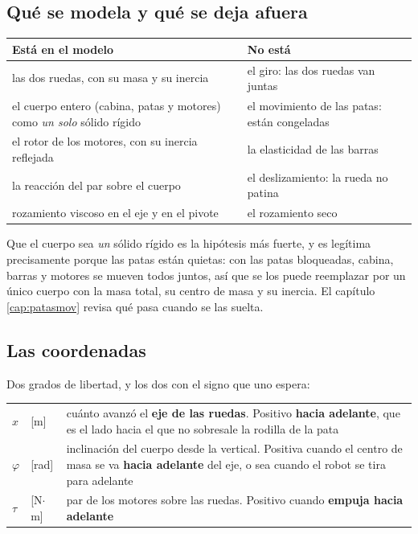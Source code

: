 \documentclass[11pt,a4paper]{report}
\begin{document}
\subsection{Qué se modela y qué se deja afuera}

\begin{center}
\small
\begin{tabular}{@{}p{7.2cm}p{7.2cm}@{}}
\toprule
\textbf{Está en el modelo} & \textbf{No está} \\
\midrule
las dos ruedas, con su masa y su inercia & el giro: las dos ruedas van juntas \\
el cuerpo entero (cabina, patas y motores) como \emph{un solo} sólido rígido & el movimiento de las patas: están congeladas \\
el rotor de los motores, con su inercia reflejada & la elasticidad de las barras \\
la reacción del par sobre el cuerpo & el deslizamiento: la rueda no patina \\
rozamiento viscoso en el eje y en el pivote & el rozamiento seco \\
\bottomrule
\end{tabular}
\end{center}

Que el cuerpo sea \emph{un} sólido rígido es la hipótesis más fuerte, y es legítima
precisamente porque las patas están quietas: con las patas bloqueadas, cabina, barras y
motores se mueven todos juntos, así que se los puede reemplazar por un único cuerpo con la
masa total, su centro de masa y su inercia. El capítulo \ref{cap:patasmov} revisa qué pasa
cuando se las suelta.

\subsection{Las coordenadas}

Dos grados de libertad, y los dos con el signo que uno espera:

\begin{center}
\begin{tabular}{@{}llp{9.4cm}@{}}
\toprule
$x$ & [m] & cuánto avanzó el \textbf{eje de las ruedas}. Positivo \textbf{hacia adelante},
que es el lado hacia el que no sobresale la rodilla de la pata \\
$\varphi$ & [rad] & inclinación del cuerpo desde la vertical. Positiva cuando el centro de
masa se va \textbf{hacia adelante} del eje, o sea cuando el robot se tira para adelante \\
$\tau$ & [N$\cdot$m] & par de los motores sobre las ruedas. Positivo cuando \textbf{empuja
hacia adelante} \\
\bottomrule
\end{tabular}
\end{center}
\end{document}
